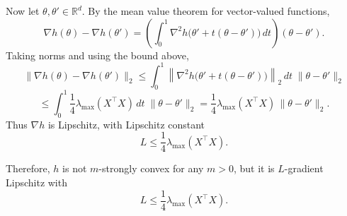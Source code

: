 \documentclass{article}
\begin{document}
Now let \(\theta,\theta'\in\mathbb{R}^d\). By the mean value theorem for vector-valued functions,
\[
\nabla h(\theta)-\nabla h(\theta')
=
\left(\int_0^1 \nabla^2 h\bigl(\theta'+t(\theta-\theta')\bigr)\,dt\right)(\theta-\theta').
\]
Taking norms and using the bound above,
\[
\|\nabla h(\theta)-\nabla h(\theta')\|_2
\le
\int_0^1
\left\|\nabla^2 h\bigl(\theta'+t(\theta-\theta')\bigr)\right\|_2\,dt \;\|\theta-\theta'\|_2
\]
\[
\le
\int_0^1 \frac14 \lambda_{\max}(X^\top X)\,dt \;\|\theta-\theta'\|_2
=
\frac14 \lambda_{\max}(X^\top X)\,\|\theta-\theta'\|_2.
\]
Thus \(\nabla h\) is Lipschitz, with Lipschitz constant
\[
L\le \frac14 \lambda_{\max}(X^\top X).
\]

Therefore, \(h\) is not \(m\)-strongly convex for any \(m>0\), but it is \(L\)-gradient Lipschitz with
\[
L\le \frac14 \lambda_{\max}(X^\top X).
\]
\end{document}
